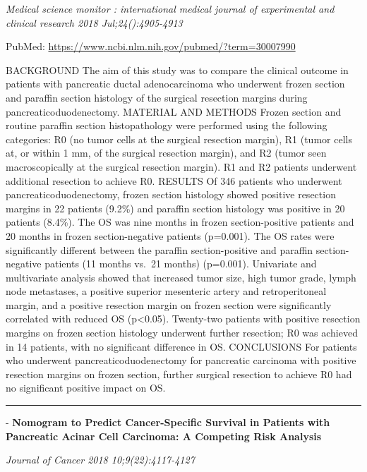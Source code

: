 \documentclass[]{article}
\begin{document}
\emph{Medical science monitor : international medical journal of
experimental and clinical research 2018 Jul;24():4905-4913}

PubMed: \url{https://www.ncbi.nlm.nih.gov/pubmed/?term=30007990}

BACKGROUND The aim of this study was to compare the clinical outcome in
patients with pancreatic ductal adenocarcinoma who underwent frozen
section and paraffin section histology of the surgical resection margins
during pancreaticoduodenectomy. MATERIAL AND METHODS Frozen section and
routine paraffin section histopathology were performed using the
following categories: R0 (no tumor cells at the surgical resection
margin), R1 (tumor cells at, or within 1 mm, of the surgical resection
margin), and R2 (tumor seen macroscopically at the surgical resection
margin). R1 and R2 patients underwent additional resection to achieve
R0. RESULTS Of 346 patients who underwent pancreaticoduodenectomy,
frozen section histology showed positive resection margins in 22
patients (9.2\%) and paraffin section histology was positive in 20
patients (8.4\%). The OS was nine months in frozen section-positive
patients and 20 months in frozen section-negative patients (p=0.001).
The OS rates were significantly different between the paraffin
section-positive and paraffin section-negative patients (11 months
vs.~21 months) (p=0.001). Univariate and multivariate analysis showed
that increased tumor size, high tumor grade, lymph node metastases, a
positive superior mesenteric artery and retroperitoneal margin, and a
positive resection margin on frozen section were significantly
correlated with reduced OS (p\textless{}0.05). Twenty-two patients with
positive resection margins on frozen section histology underwent further
resection; R0 was achieved in 14 patients, with no significant
difference in OS. CONCLUSIONS For patients who underwent
pancreaticoduodenectomy for pancreatic carcinoma with positive resection
margins on frozen section, further surgical resection to achieve R0 had
no significant positive impact on OS.

{}

{}

\begin{center}\rule{0.5\linewidth}{\linethickness}\end{center}

 - \textbf{Nomogram to Predict Cancer-Specific Survival in Patients with
Pancreatic Acinar Cell Carcinoma: A Competing Risk Analysis}

\emph{Journal of Cancer 2018 10;9(22):4117-4127}
\end{document}
